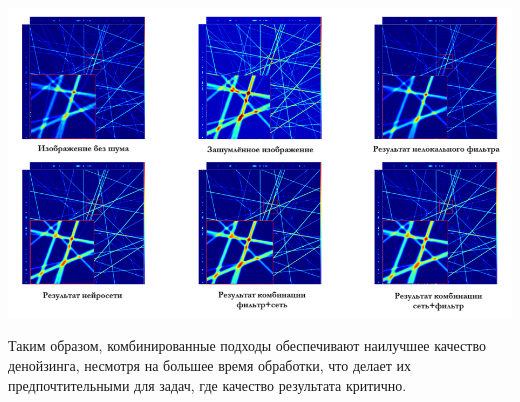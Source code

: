 \begin{minipage}{\textwidth}
	\centering
	\vspace{\mfloatsep} %
	\includegraphics[keepaspectratio=true,scale=0.67] {my_folder/images/denoising/test_16_all.png}
	\label{fig:synthetic-denoise-16-all}  
	\vspace{\mfloatsep} %
\end{minipage}
\par Таким образом, комбинированные подходы обеспечивают наилучшее качество денойзинга, несмотря на большее время обработки, что делает их предпочтительными для задач, где качество результата критично.
